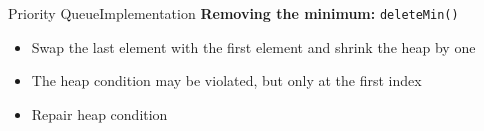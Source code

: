 
\begin{frame}{Priority Queue}{Implementation}
  \textbf{Removing the minimum:}
  {\color{Mittel-Blau}\texttt{deleteMin()}}
  \begin{itemize}
    \item
      Swap the last element with the first element and shrink the heap by one
    \item
      The {\color{Mittel-Blau}heap condition} may be violated, but only at the
      first index
    \item
      Repair {\color{Mittel-Blau}heap condition}
  \end{itemize}
  \begin{figure}[!h]
    \begin{adjustbox}{height=0.275\linewidth}
    \end{adjustbox}
    \hspace{0.5em}\hspace{-1.5em}
    \begin{adjustbox}{height=0.275\linewidth}
    \end{adjustbox}
    \label{fig:priority_queue:impl_pop}%
  \end{figure}%
\end{frame}


